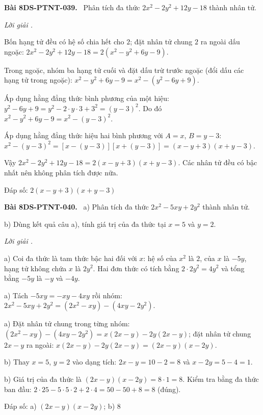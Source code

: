 \documentclass[12pt,a4paper]{article}
\newenvironment{problem}[1][]{\par\medskip\noindent\textbf{Bài #1.}\ }{\par}
\newenvironment{solution}[1][]{\par\noindent\textit{Lời giải #1.}\par}{\par}
\begin{document}
\begin{problem}[8DS-PTNT-039]
Phân tích đa thức $2x^2 - 2y^2 + 12y - 18$ thành nhân tử.

\begin{solution}
Bốn hạng tử đều có hệ số chia hết cho $2$; đặt nhân tử chung $2$ ra ngoài dấu ngoặc: $2x^2 - 2y^2 + 12y - 18 = 2(x^2 - y^2 + 6y - 9)$.

Trong ngoặc, nhóm ba hạng tử cuối và đặt dấu trừ trước ngoặc (đổi dấu các hạng tử trong ngoặc): $x^2 - y^2 + 6y - 9 = x^2 - (y^2 - 6y + 9)$.

Áp dụng hằng đẳng thức bình phương của một hiệu: $y^2 - 6y + 9 = y^2 - 2 \cdot y \cdot 3 + 3^2 = (y - 3)^2$. Do đó $x^2 - y^2 + 6y - 9 = x^2 - (y - 3)^2$.

Áp dụng hằng đẳng thức hiệu hai bình phương với $A = x$, $B = y - 3$: $x^2 - (y - 3)^2 = \left[x - (y - 3)\right]\left[x + (y - 3)\right] = (x - y + 3)(x + y - 3)$.

Vậy $2x^2 - 2y^2 + 12y - 18 = 2(x - y + 3)(x + y - 3)$. Các nhân tử đều có bậc nhất nên không phân tích được nữa.

Đáp số: $\boxed{2(x - y + 3)(x + y - 3)}$
\end{solution}
\end{problem}

\begin{problem}[8DS-PTNT-040]
a) Phân tích đa thức $2x^2 - 5xy + 2y^2$ thành nhân tử.

b) Dùng kết quả câu a), tính giá trị của đa thức tại $x = 5$ và $y = 2$.

\begin{solution}
a) Coi đa thức là tam thức bậc hai đối với $x$: hệ số của $x^2$ là $2$, của $x$ là $-5y$, hạng tử không chứa $x$ là $2y^2$. Hai đơn thức có tích bằng $2 \cdot 2y^2 = 4y^2$ và tổng bằng $-5y$ là $-y$ và $-4y$.

a) Tách $-5xy = -xy - 4xy$ rồi nhóm: $2x^2 - 5xy + 2y^2 = (2x^2 - xy) - (4xy - 2y^2)$.

a) Đặt nhân tử chung trong từng nhóm: $(2x^2 - xy) - (4xy - 2y^2) = x(2x - y) - 2y(2x - y)$; đặt nhân tử chung $2x - y$ ra ngoài: $x(2x - y) - 2y(2x - y) = (2x - y)(x - 2y)$.

b) Thay $x = 5$, $y = 2$ vào dạng tích: $2x - y = 10 - 2 = 8$ và $x - 2y = 5 - 4 = 1$.

b) Giá trị của đa thức là $(2x - y)(x - 2y) = 8 \cdot 1 = 8$. Kiểm tra bằng đa thức ban đầu: $2 \cdot 25 - 5 \cdot 5 \cdot 2 + 2 \cdot 4 = 50 - 50 + 8 = 8$ (đúng).

Đáp số: a) $\boxed{(2x - y)(x - 2y)}$; b) $\boxed{8}$
\end{solution}
\end{problem}
\end{document}
